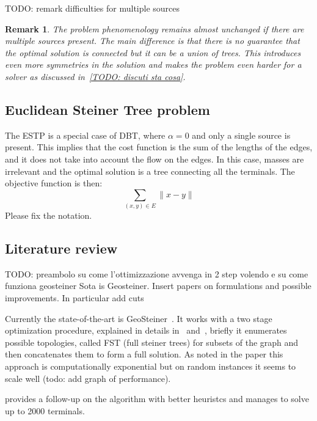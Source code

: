 \documentclass[12pt,a4paper]{article}
\numberwithin{equation}{section}
\theoremstyle{mytheorem}
\theoremstyle{myremark}
\newtheorem{remark}[subsection]{Remark}
\theoremstyle{myparagraph}
\begin{document}
    TODO: remark difficulties for multiple sources

    \begin{remark}
        The problem phenomenology remains almost unchanged if there are multiple sources present. The main difference is that there is no guarantee that the optimal solution
        is connected but it can be a union of trees. This introduces even more symmetries in the solution and makes the problem even harder for a solver as discussed in~\ref{TODO: discuti sta cosa}.
    \end{remark}

    \subsection{Euclidean Steiner Tree problem}

    The ESTP is a special case of DBT, where  $\alpha=0$ and only a single source is present.
    This implies that the cost function is the sum of the lengths of the edges, and it does not take into account the flow on the edges.
    In this case, masses are irrelevant and the optimal solution is a tree connecting all the terminals.
    The objective function is then:
    \begin{equation}
        \sum_{(x,y) \in E} \|x - y\|
    \end{equation}
    {\color{red} Please fix the notation.}



    \subsection{Literature review}

    TODO: preambolo su come l'ottimizzazione avvenga in 2 step volendo e su come funziona geosteiner
    Sota is Geosteiner.
    Insert papers on formulations and possible improvements. In particular add cuts

    Currently the state-of-the-art is GeoSteiner~\cite[TODO]{TODO}.
    It works with a two stage optimization procedure, explained in details in~\cite{warme1998spanning} and~\cite{winter1997euclidean}, briefly it enumerates
    possible topologies, called FST (full steiner trees) for subsets of the graph and then concatenates them to form a full solution.
    As noted in the paper this approach is computationally exponential but on random instances it seems to scale well (todo: add graph of performance).

    \cite{warme2000exact} provides a follow-up on the algorithm with better heuristcs and manages to solve up to 2000 terminals.
\end{document}

